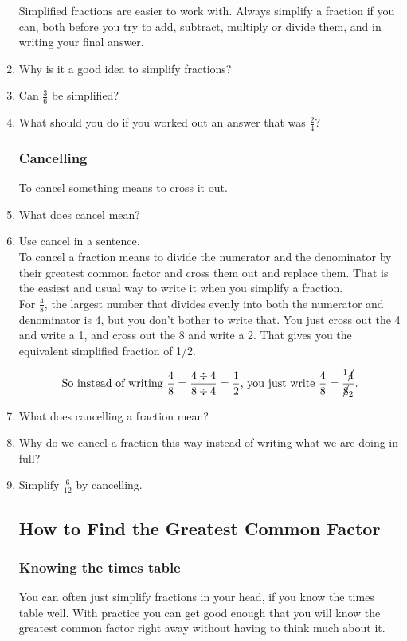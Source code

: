 \documentclass[14pt]{article}
\begin{document}
\begin{enumerate}
Simplified fractions are easier to work with. Always simplify a fraction if you can, both before you try to add, subtract, multiply or divide them, and in writing your final answer.

\item Why is it a good idea to simplify fractions?
\item Can $\frac{3}{6}$ be simplified?
\item What should you do if you worked out an answer that was $\frac{2}{4}$?

\subsubsection*{Cancelling}
To cancel something means to cross it out.\\

\item What does cancel mean?
\item Use cancel in a sentence.\\

To cancel a fraction means to divide the numerator and the denominator by their greatest common factor and cross them out and replace them. That is the easiest and usual way to write it when you simplify a fraction.\\

For $\frac{4}{8}$, the largest number that divides evenly into both the numerator and denominator is 4, but you don't bother to write that. You just cross out the 4 and write a 1, and cross out the 8 and write a 2. That gives you the equivalent simplified fraction of 1/2.

$$\text{So instead of writing }\frac{4}{8} = \frac{4 \div 4}{8 \div 4} = \frac{1}{2}\text{, you just write }\frac{4}{8} = \frac{^1 \cancel{4}}{\cancel{8}_2}\text{.}$$

\item What does cancelling a fraction mean?
\item Why do we cancel a fraction this way instead of writing what we are doing in full?
\item Simplify $\frac{6}{12}$ by cancelling.

\subsection*{How to Find the Greatest Common Factor}

\subsubsection*{Knowing the times table} You can often just simplify fractions in your head, if you know the times table well. With practice you can get good enough that you will know the greatest common factor right away without having to think much about it.\\


\end{enumerate}
\end{document}
